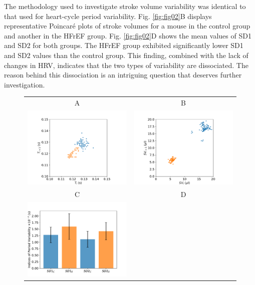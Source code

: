 \documentclass[%
preprint,
 amsmath,amssymb,
 aps,
]{revtex4-2}
\begin{document}
The methodology used to investigate stroke volume variability was identical to that used for heart-cycle period variability. Fig. \ref{fig:fig02}B displays representative Poincaré plots of stroke volumes for a mouse in the control group and another in the HFrEF group. Fig. \ref{fig:fig02}D shows the mean values of SD1 and SD2 for both groups. The HFrEF group exhibited significantly lower SD1 and SD2 values than the control group. This finding, combined with the lack of changes in HRV, indicates that the two types of variability are dissociated. The reason behind this dissociation is an intriguing question that deserves further investigation. 

\begin{figure}[h!]
    \begin{tabular}{cc}
        A & B \\
        \includegraphics[width=3in]{Fig02_A.pdf} &
        \includegraphics[width=3in]{Fig02_B.pdf} \\
        C & D \\
        \includegraphics[width=3in]{Fig02_C.pdf} &

\end{tabular}
\end{figure}
\end{document}

